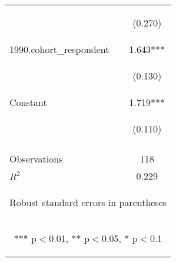 \begin{center}
\begin{tabular}{lc}
\vspace{4pt} & \begin{footnotesize}(0.270)\end{footnotesize} \\
1990.cohort\_respondent & 1.643*** \\
\vspace{4pt} & \begin{footnotesize}(0.130)\end{footnotesize} \\
Constant & 1.719*** \\
 & \begin{footnotesize}(0.110)\end{footnotesize} \\
\vspace{4pt} & \begin{footnotesize}\end{footnotesize} \\
Observations & 118 \\
 $R^2$ & 0.229 \\ \hline
\multicolumn{2}{c}{\begin{footnotesize} Robust standard errors in parentheses\end{footnotesize}} \\
\multicolumn{2}{c}{\begin{footnotesize} *** p$<$0.01, ** p$<$0.05, * p$<$0.1\end{footnotesize}} \\
\end{tabular}
\end{center}
